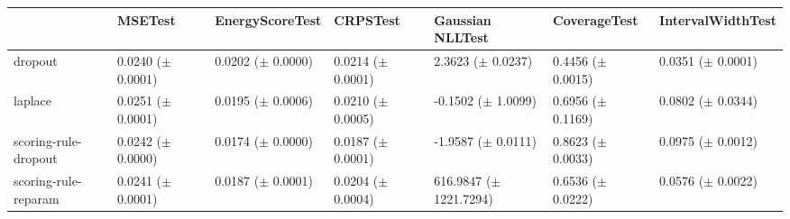\begin{tabular}{lllllll}
\toprule
 & MSETest & EnergyScoreTest & CRPSTest & Gaussian NLLTest & CoverageTest & IntervalWidthTest \\
\midrule
dropout & \makecell{0.0240 \\ ($\pm$ 0.0001)} & \makecell{0.0202 \\ ($\pm$ 0.0000)} & \makecell{0.0214 \\ ($\pm$ 0.0001)} & \makecell{2.3623 \\ ($\pm$ 0.0237)} & \makecell{0.4456 \\ ($\pm$ 0.0015)} & \makecell{0.0351 \\ ($\pm$ 0.0001)} \\
laplace & \makecell{0.0251 \\ ($\pm$ 0.0001)} & \makecell{0.0195 \\ ($\pm$ 0.0006)} & \makecell{0.0210 \\ ($\pm$ 0.0005)} & \makecell{-0.1502 \\ ($\pm$ 1.0099)} & \makecell{0.6956 \\ ($\pm$ 0.1169)} & \makecell{0.0802 \\ ($\pm$ 0.0344)} \\
scoring-rule-dropout & \makecell{0.0242 \\ ($\pm$ 0.0000)} & \makecell{0.0174 \\ ($\pm$ 0.0000)} & \makecell{0.0187 \\ ($\pm$ 0.0001)} & \makecell{-1.9587 \\ ($\pm$ 0.0111)} & \makecell{0.8623 \\ ($\pm$ 0.0033)} & \makecell{0.0975 \\ ($\pm$ 0.0012)} \\
scoring-rule-reparam & \makecell{0.0241 \\ ($\pm$ 0.0001)} & \makecell{0.0187 \\ ($\pm$ 0.0001)} & \makecell{0.0204 \\ ($\pm$ 0.0004)} & \makecell{616.9847 \\ ($\pm$ 1221.7294)} & \makecell{0.6536 \\ ($\pm$ 0.0222)} & \makecell{0.0576 \\ ($\pm$ 0.0022)} \\
\bottomrule
\end{tabular}
